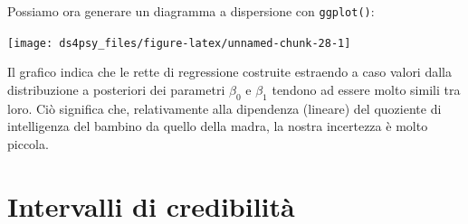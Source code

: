 \documentclass[
  11pt,
]{krantz}
\makeatletter
\newenvironment{Shaded}{\begin{snugshade}}{\end{snugshade}}
\newcommand{\AttributeTok}[1]{\textcolor[rgb]{0.61,0.61,0.61}{#1}}
\newcommand{\FloatTok}[1]{\textcolor[rgb]{0.06,0.06,0.06}{#1}}
\newcommand{\FunctionTok}[1]{\textcolor[rgb]{0,0,0}{#1}}
\newcommand{\NormalTok}[1]{#1}
\newcommand{\SpecialCharTok}[1]{\textcolor[rgb]{0,0,0}{#1}}
\newcommand{\StringTok}[1]{\textcolor[rgb]{0.5,0.5,0.5}{#1}}
\newenvironment{kframe}{%
\medskip{}
\setlength{\fboxsep}{.8em}
 \def\at@end@of@kframe{}%
 \ifinner\ifhmode%
  \def\at@end@of@kframe{\end{minipage}}%
  \begin{minipage}{\columnwidth}%
 \fi\fi%
 \def\FrameCommand##1{\hskip\@totalleftmargin \hskip-\fboxsep
 \colorbox{shadecolor}{##1}\hskip-\fboxsep
     \hskip-\linewidth \hskip-\@totalleftmargin \hskip\columnwidth}%
 \MakeFramed {\advance\hsize-\width
   \@totalleftmargin\z@ \linewidth\hsize
   \@setminipage}}%
 {\par\unskip\endMakeFramed%
 \at@end@of@kframe}
\renewenvironment{Shaded}{\begin{kframe}}{\end{kframe}}
\theoremstyle{definition}
\theoremstyle{definition}
\theoremstyle{definition}
\theoremstyle{definition}
\theoremstyle{remark}
\makeatother
\begin{document}
Possiamo ora generare un diagramma a dispersione con \texttt{ggplot()}:

\begin{Shaded}
\end{Shaded}

\begin{center}\texttt{[image: ds4psy\_files/figure-latex/unnamed-chunk-28-1]} \end{center}

Il grafico indica che le rette di regressione costruite estraendo a caso valori dalla distribuzione a posteriori dei parametri \(\beta_0\) e \(\beta_1\) tendono ad essere molto simili tra loro. Ciò significa che, relativamente alla dipendenza (lineare) del quoziente di intelligenza del bambino da quello della madra, la nostra incertezza è molto piccola.

\hypertarget{intervalli-di-credibilituxe0}{%
\section{Intervalli di credibilità}\label{intervalli-di-credibilituxe0}}
\end{document}
